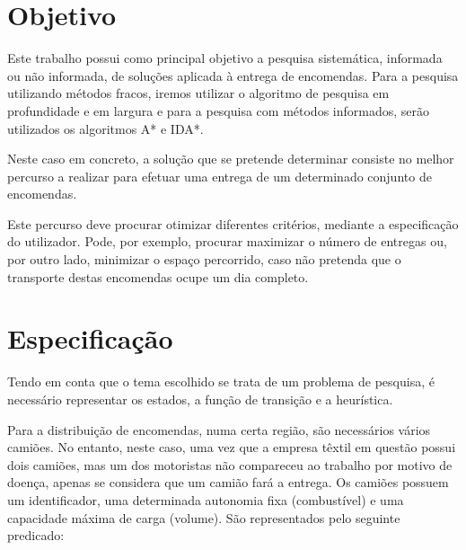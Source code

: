\documentclass[a4paper]{article}
\begin{document}

\newpage

\tableofcontents



\newpage

\section{Objetivo}

Este trabalho possui como principal objetivo a pesquisa sistemática, informada ou não informada, de soluções aplicada à entrega de encomendas. Para a pesquisa utilizando métodos fracos, iremos utilizar o algoritmo de pesquisa em profundidade e em largura e para a pesquisa com métodos informados, serão utilizados os algoritmos A* e IDA*. 

Neste caso em concreto, a solução que se pretende determinar consiste no melhor percurso a realizar para efetuar uma entrega de um determinado conjunto de encomendas.

Este percurso deve procurar otimizar diferentes critérios, mediante a especificação do utilizador. Pode, por exemplo, procurar maximizar o número de entregas ou, por outro lado, minimizar o espaço percorrido, caso não pretenda que o transporte destas encomendas ocupe um dia completo.

\newpage

\section{Especificação}

Tendo em conta que o tema escolhido se trata de um problema de pesquisa, é necessário representar os estados, a função de transição e a heurística.

Para a distribuição de encomendas, numa certa região, são necessários vários camiões. No entanto, neste caso, uma vez que a empresa têxtil em questão possui dois camiões, mas um dos motoristas não compareceu ao trabalho por motivo de doença, apenas se considera que um camião fará a entrega. Os camiões possuem um identificador, uma determinada autonomia fixa (combustível) e uma capacidade máxima de carga (volume). São representados pelo seguinte predicado:
\end{document}

